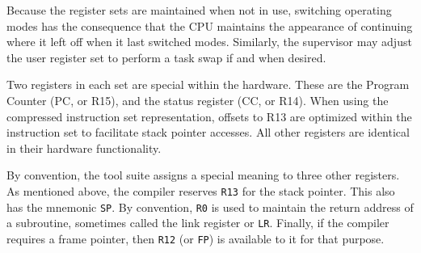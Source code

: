 \documentclass{gqtekspec}
\begin{document}
Because the register sets are maintained when not in use, switching operating
modes has the consequence that the CPU maintains the appearance of continuing
where it left off when it last switched modes.  Similarly, the supervisor
may adjust the user register set to perform a task swap if and when desired.

Two registers in each set are special within the hardware.  These are the
Program Counter (PC, or R15), and the status register (CC, or R14).  When
using the compressed instruction set representation, offsets to R13 are
optimized within the instruction set to facilitate stack pointer accesses.
All other registers are identical in their hardware functionality.

By convention, the tool suite assigns a special meaning to three other
registers.  As mentioned above, the compiler reserves {\tt R13} for the
stack pointer.  This also has the mnemonic {\tt SP}.  By convention, {\tt R0}
is used to maintain the return address of a subroutine, sometimes called the
link register or {\tt LR}.  Finally, if the compiler requires a frame pointer,
then {\tt R12} (or {\tt FP}) is available to it for that purpose.
\end{document}
